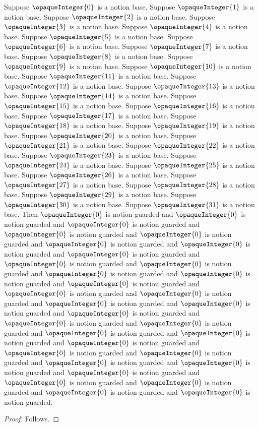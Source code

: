 

\begin{proposition}\label{notion_repeated_query}
    Suppose $\opaqueInteger{0}$ is a notion base.
    Suppose $\opaqueInteger{1}$ is a notion base.
    Suppose $\opaqueInteger{2}$ is a notion base.
    Suppose $\opaqueInteger{3}$ is a notion base.
    Suppose $\opaqueInteger{4}$ is a notion base.
    Suppose $\opaqueInteger{5}$ is a notion base.
    Suppose $\opaqueInteger{6}$ is a notion base.
    Suppose $\opaqueInteger{7}$ is a notion base.
    Suppose $\opaqueInteger{8}$ is a notion base.
    Suppose $\opaqueInteger{9}$ is a notion base.
    Suppose $\opaqueInteger{10}$ is a notion base.
    Suppose $\opaqueInteger{11}$ is a notion base.
    Suppose $\opaqueInteger{12}$ is a notion base.
    Suppose $\opaqueInteger{13}$ is a notion base.
    Suppose $\opaqueInteger{14}$ is a notion base.
    Suppose $\opaqueInteger{15}$ is a notion base.
    Suppose $\opaqueInteger{16}$ is a notion base.
    Suppose $\opaqueInteger{17}$ is a notion base.
    Suppose $\opaqueInteger{18}$ is a notion base.
    Suppose $\opaqueInteger{19}$ is a notion base.
    Suppose $\opaqueInteger{20}$ is a notion base.
    Suppose $\opaqueInteger{21}$ is a notion base.
    Suppose $\opaqueInteger{22}$ is a notion base.
    Suppose $\opaqueInteger{23}$ is a notion base.
    Suppose $\opaqueInteger{24}$ is a notion base.
    Suppose $\opaqueInteger{25}$ is a notion base.
    Suppose $\opaqueInteger{26}$ is a notion base.
    Suppose $\opaqueInteger{27}$ is a notion base.
    Suppose $\opaqueInteger{28}$ is a notion base.
    Suppose $\opaqueInteger{29}$ is a notion base.
    Suppose $\opaqueInteger{30}$ is a notion base.
    Suppose $\opaqueInteger{31}$ is a notion base.
    Then $\opaqueInteger{0}$ is notion guarded and $\opaqueInteger{0}$ is notion guarded and $\opaqueInteger{0}$ is notion guarded and $\opaqueInteger{0}$ is notion guarded and $\opaqueInteger{0}$ is notion guarded and $\opaqueInteger{0}$ is notion guarded and $\opaqueInteger{0}$ is notion guarded and $\opaqueInteger{0}$ is notion guarded and $\opaqueInteger{0}$ is notion guarded and $\opaqueInteger{0}$ is notion guarded and $\opaqueInteger{0}$ is notion guarded and $\opaqueInteger{0}$ is notion guarded and $\opaqueInteger{0}$ is notion guarded and $\opaqueInteger{0}$ is notion guarded and $\opaqueInteger{0}$ is notion guarded and $\opaqueInteger{0}$ is notion guarded and $\opaqueInteger{0}$ is notion guarded and $\opaqueInteger{0}$ is notion guarded and $\opaqueInteger{0}$ is notion guarded and $\opaqueInteger{0}$ is notion guarded and $\opaqueInteger{0}$ is notion guarded and $\opaqueInteger{0}$ is notion guarded and $\opaqueInteger{0}$ is notion guarded and $\opaqueInteger{0}$ is notion guarded and $\opaqueInteger{0}$ is notion guarded and $\opaqueInteger{0}$ is notion guarded and $\opaqueInteger{0}$ is notion guarded and $\opaqueInteger{0}$ is notion guarded and $\opaqueInteger{0}$ is notion guarded and $\opaqueInteger{0}$ is notion guarded and $\opaqueInteger{0}$ is notion guarded and $\opaqueInteger{0}$ is notion guarded.
\end{proposition}
\begin{proof}
    Follows.
\end{proof}
